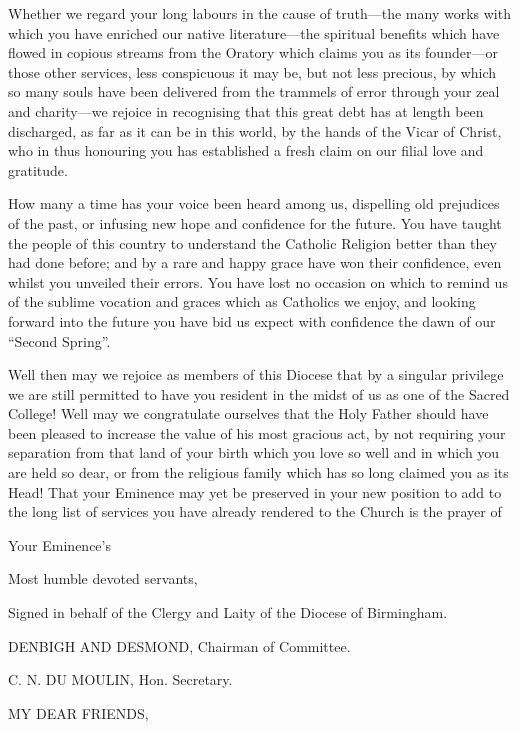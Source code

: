 Whether we regard your long labours in the cause of truth—the
many works with which you have enriched our native literature—the
spiritual benefits which have flowed in copious streams from the
Oratory which claims you as its founder—or those other services,
less conspicuous it may be, but not less precious, by which so many
souls have been delivered from the trammels of error through your zeal
and charity—we rejoice in recognising that this great debt has at
length been discharged, as far as it can be in this world, by the
hands of the Vicar of Christ, who in thus honouring you has
established a fresh claim on our filial love and gratitude.

How many a time has your voice been heard among us, dispelling old
prejudices of the past, or infusing new hope and confidence for the
future. You have taught the people of this country to understand
the Catholic Religion better than they had done before; and by a rare
and happy grace have won their confidence, even whilst you unveiled
their errors. You have lost no occasion on which to remind us of the
sublime vocation and graces which as Catholics we enjoy, and looking
forward into the future you have bid us expect with confidence the
dawn of our ``Second Spring''.

Well then may we rejoice as members of this Diocese that by a
singular privilege we are still permitted to have you resident in the
midst of us as one of the Sacred College! Well may we congratulate
ourselves that the Holy Father should have been pleased to increase
the value of his most gracious act, by not requiring your separation
from that land of your birth which you love so well and in which you
are held so dear, or from the religious family which has so long
claimed you as its Head! That your Eminence may yet be preserved in
your new position to add to the long list of services you have already
rendered to the Church is the prayer of

Your Eminence's

Most humble devoted servants,

Signed in behalf of the Clergy and Laity of the Diocese of Birmingham.

DENBIGH AND DESMOND,
Chairman of Committee.

C. N. DU MOULIN, Hon.
Secretary.


MY DEAR FRIENDS,

